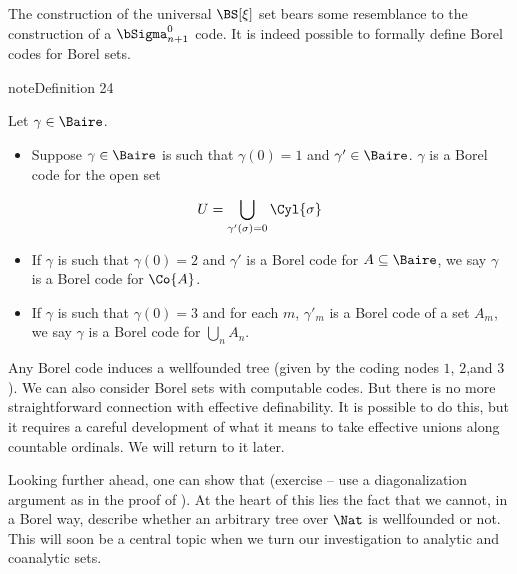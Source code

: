\documentclass[letterpaper,10pt,english]{jupyterBook}
\begin{document}
\sphinxAtStartPar
The construction of the universal \(\BS[\xi]\) set bears some resemblance to the construction of a \(\bSigma^0_{n+1}\) code. It is indeed possible to formally define Borel codes for  Borel sets.
\label{structureBorel:def-Borel-codes-transfinite}
\begin{sphinxadmonition}{note}{Definition 24}



\sphinxAtStartPar
Let \(\gamma \in \Baire\).
\begin{itemize}
\item {} 
\sphinxAtStartPar
Suppose \(\gamma \in \Baire\) is such that \(\gamma(0) = 1\) and \(\gamma' \in \Baire\). \(\gamma\) is a Borel code for the open set

\end{itemize}
\begin{equation*}
    U = \bigcup_{\gamma'(\sigma) = 0} \Cyl{\sigma}
\end{equation*}\begin{itemize}
\item {} 
\sphinxAtStartPar
If \(\gamma\) is such that \(\gamma(0)=2\) and \(\gamma'\) is a Borel code for \(A \subseteq \Baire\), we say \(\gamma\) is a Borel code for \(\Co{A}\).

\item {} 
\sphinxAtStartPar
If \(\gamma\) is such that \(\gamma(0)=3\) and for each \(m\), \(\gamma'_m\) is a Borel code of a set \(A_m\), we say \(\gamma\) is a Borel code for \(\bigcup_n A_n\).

\end{itemize}
\end{sphinxadmonition}

\sphinxAtStartPar
Any Borel code induces a well\sphinxhyphen{}founded tree (given by the coding nodes \(1\), \(2\),and \(3\)). We can also consider Borel sets with computable codes. But there is no more straightforward connection with effective definability. It is possible to do this, but it requires a careful development of what it means to take effective unions along countable ordinals. We will return to it later.

\sphinxAtStartPar
Looking further ahead, one can show that  (exercise – use a diagonalization argument as in the proof of {\hyperref[\detokenize{structureBorel:thm-Borel-proper}]{}}). At the heart of this lies the fact that we cannot, in a Borel way, describe whether an arbitrary tree over \(\Nat\) is well\sphinxhyphen{}founded or not. This will soon be a central topic when we turn our investigation to analytic and co\sphinxhyphen{}analytic sets.
\end{document}
